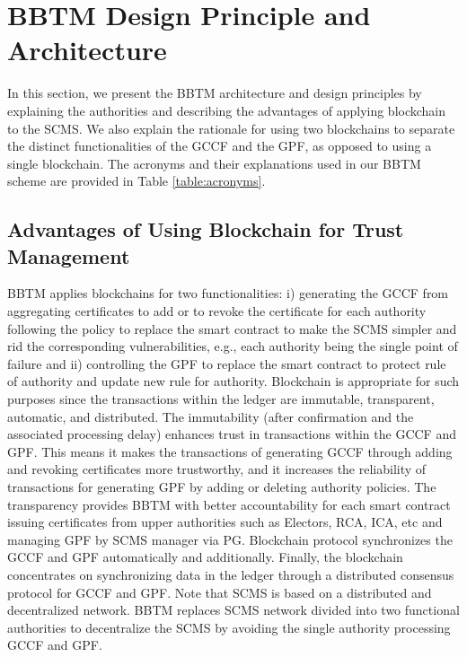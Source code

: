 \section{BBTM Design Principle and Architecture} %
\label{sa} 
In this section, we present the BBTM architecture and design principles by explaining the authorities and describing the advantages of applying blockchain to the SCMS. We also explain the rationale for using two blockchains to separate the distinct functionalities of the GCCF and the GPF, as opposed to using a single blockchain. The acronyms and their explanations used in our BBTM scheme are provided in Table \ref{table:acronyms}.




\subsection{Advantages of Using Blockchain for Trust Management}

BBTM applies blockchains for two functionalities: i) generating the GCCF from aggregating certificates to add or to revoke the certificate for each authority following the policy to replace the smart contract to make the SCMS simpler and rid the corresponding vulnerabilities, e.g., each authority being the single point of failure and ii) controlling the GPF to replace the smart contract to protect rule of authority and update new rule for authority.
Blockchain is appropriate for such purposes since the transactions within the ledger are immutable, transparent, automatic, and distributed. The immutability (after confirmation and the associated processing delay) enhances trust in transactions within the GCCF and GPF. This means it makes the transactions of generating GCCF through adding and revoking certificates more trustworthy, and it increases the reliability of transactions for generating GPF by adding or deleting authority policies. The transparency provides BBTM with better accountability for each smart contract issuing certificates from upper authorities such as Electors, RCA, ICA, etc and managing GPF by SCMS manager via PG. Blockchain protocol synchronizes the GCCF and GPF automatically and additionally. Finally, the blockchain concentrates on synchronizing data in the ledger through a distributed consensus protocol for GCCF and GPF. Note that SCMS is based on a distributed and decentralized network. BBTM replaces SCMS network divided into two functional authorities to decentralize the SCMS by avoiding the single authority  processing GCCF and GPF.





